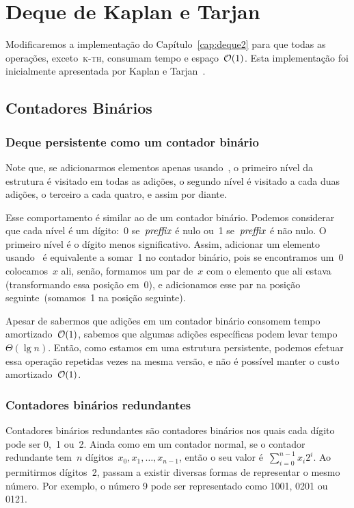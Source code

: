 \documentclass[../../main.tex]{subfiles}
\begin{document}
\chapter{Deque de Kaplan e Tarjan} \label{cap:deque3}

Modificaremos a implementação do Capítulo~\ref{cap:deque2} para que todas as operações, exceto~\textsc{k-th}, consumam tempo e espaço~$\mathcal{O}(1)$. Esta implementação foi inicialmente apresentada por Kaplan e Tarjan~\cite{KaplanT1999}.

\section{Contadores Binários} \label{sec:contbin}

\subsection{Deque persistente como um contador binário}

Note que, se adicionarmos elementos apenas usando~, o primeiro nível da estrutura é visitado em todas as adições, o segundo nível é visitado a cada duas adições, o terceiro a cada quatro, e assim por diante.

Esse comportamento é similar ao de um contador binário. Podemos considerar que cada nível é um dígito:~0 se~$\mathit{preffix}$ é nulo ou~1 se~$\mathit{preffix}$ é não nulo. O primeiro nível é o dígito menos significativo. Assim, adicionar um elemento usando~ é equivalente a somar~1 no contador binário, pois se encontramos um~0 colocamos~$x$ ali, senão, formamos um par de~$x$ com o elemento que ali estava (transformando essa posição em~0), e adicionamos esse par na posição seguinte~(somamos~1 na posição seguinte).

Apesar de sabermos que adições em um contador binário consomem tempo amortizado~$\mathcal{O}(1)$, sabemos que algumas adições específicas podem levar tempo~$\Theta(\lg n)$. Então, como estamos em uma estrutura persistente, podemos efetuar essa operação repetidas vezes na mesma versão, e não é possível manter o custo amortizado~$\mathcal{O}(1)$.

\subsection{Contadores binários redundantes}

Contadores binários redundantes são contadores binários nos quais cada dígito pode ser 0,~1 ou~2. Ainda como em um contador normal, se o contador redundante tem~$n$ dígitos~$x_0, x_1, \ldots, x_{n-1}$, então o seu valor é~$\sum\limits_{i=0}^{n-1}{x_i 2^i}$. Ao permitirmos dígitos~2, passam a existir diversas formas de representar o mesmo número. Por exemplo, o número 9 pode ser representado como 1001, 0201 ou 0121.
\end{document}
